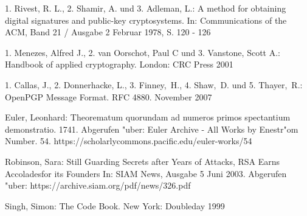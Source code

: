 \begin{thebibliography}{9}
1. Rivest, R. L., 2. Shamir, A. und 3. Adleman, L.:
A method for obtaining digital signatures and public-key cryptosystems.
In: Communications of the ACM, Band 21 / Ausgabe 2 Februar 1978, S. 120 - 126

1. Menezes, Alfred J., 2. van Oorschot, Paul C und 3. Vanstone, Scott A.:
Handbook of applied cryptography.
London: CRC Press 2001

1. Callas, J., 2. Donnerhacke, L., 3. Finney,~H., 4. Shaw,~D. und 5. Thayer,~R.:
OpenPGP Message Format. RFC 4880. November 2007

Euler, Leonhard: Theorematum quorundam ad numeros primos spectantium demonstratio.
1741. Abgerufen "uber: Euler Archive - All Works by Enestr"om Number. 54.
https://scholarlycommons.pacific.edu/euler-works/54

Robinson, Sara: Still Guarding Secrets after Years of Attacks, RSA Earns Accoladesfor its Founders
In: SIAM News, Ausgabe 5 Juni 2003.
Abgerufen "uber: https://archive.siam.org/pdf/news/326.pdf

Singh, Simon: The Code Book. New York: Doubleday 1999

\piicitations
\end{thebibliography}
